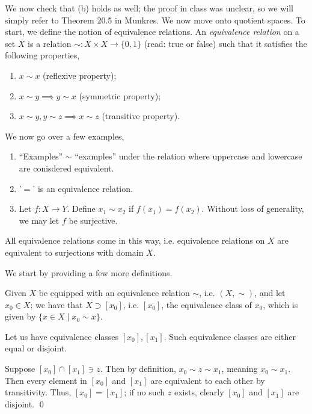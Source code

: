 \noindent We now check that (b) holds as well; the proof in class was unclear, so we will simply refer to Theorem 20.5 in Munkres.
\medskip\newline
\noindent We now move onto quotient spaces. To start, we define the notion of equivalence relations. An \textit{equivalence relation} on a set $X$ is a relation $\sim : X \times X \to \{0, 1\}$ (read: true or false) such that it satisfies the following properties,
\begin{enumerate}[label=(\alph*)]
    \item $x \sim x$ (reflexive property);
    \item $x \sim y \implies y \sim x$ (symmetric property);
    \item $x \sim y, y \sim z \implies x \sim z$ (transitive property). 
\end{enumerate}
We now go over a few examples,
\begin{enumerate}[label=(\alph*)]
    \item ``Examples'' $\sim$ ``examples'' under the relation where uppercase and lowercase are conisdered equivalent.
    \item '$=$' is an equivalence relation.
    \item Let $f : X \to Y$. Define $x_1 \sim x_2$ if $f(x_1) = f(x_2)$. Without loss of generality, we may let $f$ be surjective.
\end{enumerate}
\begin{simplethm}
    All equivalence relations come in this way, i.e. equivalence relations on $X$ are equivalent to surjections with domain $X$.
\end{simplethm}
\noindent We start by providing a few more definitions.
\begin{definition}
    Given $X$ be equipped with an equivalence relation $\sim$, i.e. $(X, \sim)$, and let $x_0 \in X$; we have that $X \supset [x_0]$, i.e. $[x_0]$, the equivalence class of $x_0$, which is given by $\{x \in X \mid x_0 \sim x\}$.
\end{definition}
\begin{simplelemma}
    Let us have equivalence classes $[x_0], [x_1]$. Such equivalence classes are either equal or disjoint.
\end{simplelemma}
\noindent Suppose $[x_0] \cap [x_1] \ni z$. Then by definition, $x_0 \sim z \sim x_1$, meaning $x_0 \sim x_1$. Then every element in $[x_0]$ and $[x_1]$ are equivalent to each other by transitivity. Thus, $[x_0] = [x_1]$; if no such $z$ exists, clearly $[x_0]$ and $[x_1]$ are disjoint. \qed
